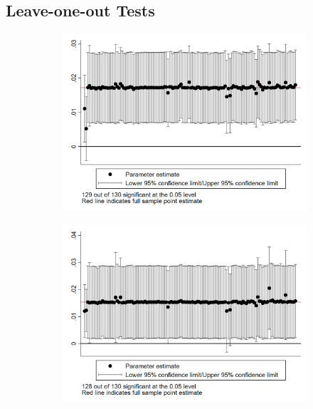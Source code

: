 \documentclass{article}
\begin{document}
\subsection{Leave-one-out Tests}
\begin{figure}[htbp]
    \centering
    \begin{subfigure}{0.3\textwidth}
        \includegraphics[width=\linewidth]{exhibits_old/figures/exogeneity_tests/loo_iv_cgoodman.png}
        \label{fig:sub1}
    \end{subfigure}
    \begin{subfigure}{0.3\textwidth}
        \includegraphics[width=\linewidth]{exhibits_old/figures/exogeneity_tests/loo_iv_gen_muni.png}
        \label{fig:sub2}

\end{subfigure}
\end{figure}
\end{document}
